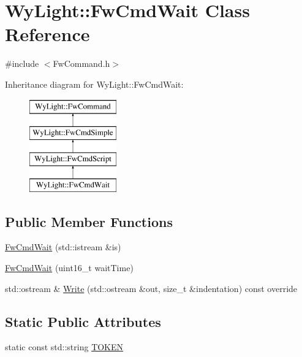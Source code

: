 \hypertarget{class_wy_light_1_1_fw_cmd_wait}{\section{Wy\-Light\-:\-:Fw\-Cmd\-Wait Class Reference}
\label{class_wy_light_1_1_fw_cmd_wait}
}


{\ttfamily \#include $<$Fw\-Command.\-h$>$}

Inheritance diagram for Wy\-Light\-:\-:Fw\-Cmd\-Wait\-:\begin{figure}[H]
\begin{center}
\leavevmode
\includegraphics[height=4.000000cm]{class_wy_light_1_1_fw_cmd_wait}
\end{center}
\end{figure}
\subsection*{Public Member Functions}
\begin{DoxyCompactItemize}
\item 
\hyperlink{class_wy_light_1_1_fw_cmd_wait_aefaea11de876a87b6e77a7abb9cb5e61}{Fw\-Cmd\-Wait} (std\-::istream \&is)
\item 
\hyperlink{class_wy_light_1_1_fw_cmd_wait_acb67aeee9e9c5643c08723482f20ba35}{Fw\-Cmd\-Wait} (uint16\-\_\-t wait\-Time)
\item 
std\-::ostream \& \hyperlink{class_wy_light_1_1_fw_cmd_wait_a8d96368a646e49b02058891417188d86}{Write} (std\-::ostream \&out, size\-\_\-t \&indentation) const override
\end{DoxyCompactItemize}
\subsection*{Static Public Attributes}
\begin{DoxyCompactItemize}
\item 
static const std\-::string \hyperlink{class_wy_light_1_1_fw_cmd_wait_aee1238c424ad877171423fc3bcab31ca}{T\-O\-K\-E\-N}
\end{DoxyCompactItemize}
